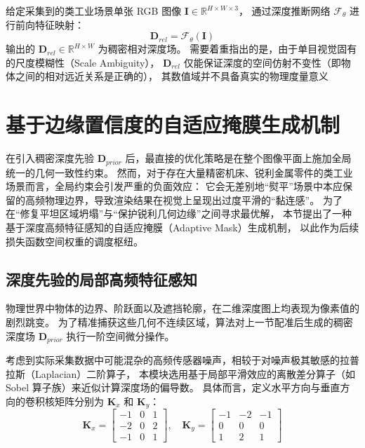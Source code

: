 给定采集到的类工业场景单张 RGB 图像 $\bm{I} \in \mathbb{R}^{H \times W \times 3}$，
通过深度推断网络 $\mathcal{F}_{\theta}$ 进行前向特征映射：
\begin{equation}
    \bm{D}_{rel} = \mathcal{F}_{\theta}(\bm{I})
    \label{eq:relative_depth}
\end{equation}
输出的 $\bm{D}_{rel} \in \mathbb{R}^{H \times W}$ 为稠密相对深度场。
需要着重指出的是，由于单目视觉固有的尺度模糊性（Scale Ambiguity），
$\bm{D}_{rel}$ 仅能保证深度的空间仿射不变性（即物体之间的相对远近关系是正确的），
其数值域并不具备真实的物理度量意义



\section{基于边缘置信度的自适应掩膜生成机制}
\label{sec:chap3_adaptive_mask}

在引入稠密深度先验 $\bm{D}_{prior}$ 后，最直接的优化策略是在整个图像平面上施加全局统一的几何一致性约束。
然而，对于存在大量精密机床、锐利金属零件的类工业场景而言，全局约束会引发严重的负面效应：
它会无差别地“熨平”场景中本应保留的高频物理边界，导致渲染结果在视觉上呈现出过度平滑的“黏连感”。
为了在“修复平坦区域坍塌”与“保护锐利几何边缘”之间寻求最优解，
本节提出了一种基于深度高频特征感知的自适应掩膜（Adaptive Mask）生成机制，
以此作为后续损失函数空间权重的调度枢纽。

\subsection{深度先验的局部高频特征感知}
\label{subsec:edge_perception}

物理世界中物体的边界、阶跃面以及遮挡轮廓，在二维深度图上均表现为像素值的剧烈跳变。
为了精准捕获这些几何不连续区域，算法对上一节配准后生成的稠密深度场 $\bm{D}_{prior}$ 执行一阶空间微分操作。

考虑到实际采集数据中可能混杂的高频传感器噪声，相较于对噪声极其敏感的拉普拉斯（Laplacian）二阶算子，
本模块选用基于局部平滑效应的离散差分算子（如 Sobel 算子族）来近似计算深度场的偏导数。
具体而言，定义水平方向与垂直方向的卷积核矩阵分别为 $\bm{K}_x$ 和 $\bm{K}_y$：
\begin{equation}
    \bm{K}_x = \begin{bmatrix} -1 & 0 & 1 \\ -2 & 0 & 2 \\ -1 & 0 & 1 \end{bmatrix}, \quad
    \bm{K}_y = \begin{bmatrix} -1 & -2 & -1 \\ 0 & 0 & 0 \\ 1 & 2 & 1 \end{bmatrix}
\end{equation}

